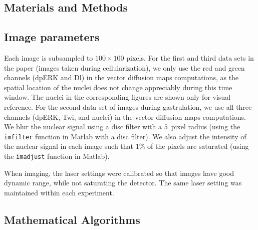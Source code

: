 \documentclass{pnastwo}
\begin{document}
\begin{article}


\section{Materials and Methods}

\subsection{Image parameters}

Each image is subsampled to $100 \times 100$ pixels.
%
For the first and third data sets in the paper (images taken during cellularization), we only use the red and green channels (dpERK and Dl) in the vector diffusion maps computations, as the spatial location of the nuclei does not change appreciably during this time window.
%
The nuclei in the corresponding figures are shown only for visual reference.
%
For the second data set of images during gastrulation, we use all three channels (dpERK, Twi, and nuclei) in the vector diffusion maps computations.
%
We blur the nuclear signal using a disc filter with a $5$~pixel radius (using the \texttt{imfilter} function in Matlab with a disc filter).
%
We also adjust the intensity of the nuclear signal in each image such that 1\% of the pixels are saturated (using the \texttt{imadjust} function in Matlab).

When imaging, the laser settings were calibrated so that images have good dynamic range, while not saturating the detector. 
% 
The same laser setting was maintained within each experiment. 



\subsection{Mathematical Algorithms}


\end{article}
\end{document}

